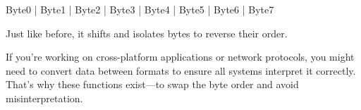 \begin{NexMainBox}
\begin{NexMainBox}[dark, crnA, title=\textbf{How does nx\_swap64 work? (64-bit swap)}]
		\begin{NexMainBox}[light]
		\begin{center}
		Byte0 | Byte1 | Byte2 | Byte3 | Byte4 | Byte5 | Byte6 | Byte7
		\end{center}
	\end{NexMainBox}
		Just like before, it shifts and isolates bytes to reverse their order.
	\end{NexMainBox}

	\begin{NexMainBox}[dark, crnA, title=\textbf{Why Is This Important?}]
		If you're working on cross-platform applications or network protocols, you might need to convert data between formats to ensure all systems interpret it correctly. That’s why these functions exist—to swap the byte order and avoid misinterpretation.
	\end{NexMainBox}
\end{NexMainBox}

